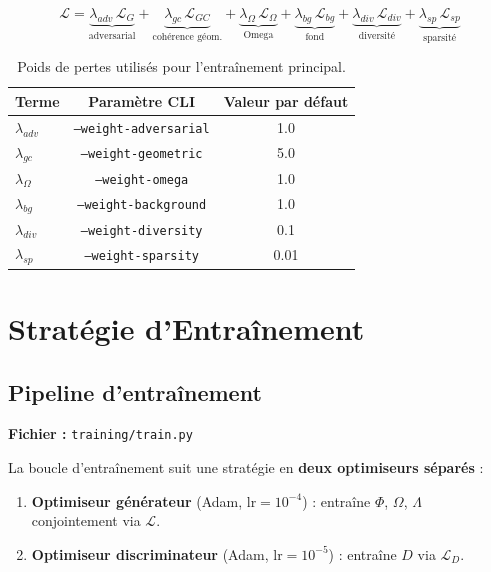 \documentclass[12pt,a4paper]{article}
\begin{document}
\begin{equation}
  \mathcal{L} = \underbrace{\lambda_{adv}\,\mathcal{L}_G}_{\text{adversarial}}
              + \underbrace{\lambda_{gc}\,\mathcal{L}_{GC}}_{\text{cohérence géom.}}
              + \underbrace{\lambda_\Omega\,\mathcal{L}_\Omega}_{\text{Omega}}
              + \underbrace{\lambda_{bg}\,\mathcal{L}_{bg}}_{\text{fond}}
              + \underbrace{\lambda_{div}\,\mathcal{L}_{div}}_{\text{diversité}}
              + \underbrace{\lambda_{sp}\,\mathcal{L}_{sp}}_{\text{sparsité}}
\end{equation}

\begin{table}[H]
  \centering
  \caption{Poids de pertes utilisés pour l'entraînement principal.}
  \begin{tabular}{lcc}
  \toprule
  \textbf{Terme} & \textbf{Paramètre CLI} & \textbf{Valeur par défaut} \\
  \midrule
  $\lambda_{adv}$  & \texttt{--weight-adversarial} & 1.0 \\
  $\lambda_{gc}$   & \texttt{--weight-geometric}   & 5.0 \\
  $\lambda_\Omega$ & \texttt{--weight-omega}        & 1.0 \\
  $\lambda_{bg}$   & \texttt{--weight-background}   & 1.0 \\
  $\lambda_{div}$  & \texttt{--weight-diversity}    & 0.1 \\
  $\lambda_{sp}$   & \texttt{--weight-sparsity}     & 0.01 \\
  \bottomrule
  \end{tabular}
\end{table}

\section{Stratégie d'Entraînement}

\subsection{Pipeline d'entraînement}

\textbf{Fichier :} \texttt{training/train.py}

La boucle d'entraînement suit une stratégie en \textbf{deux optimiseurs séparés} :

\begin{enumerate}
  \item \textbf{Optimiseur générateur} (Adam, $\text{lr}=10^{-4}$) :
        entraîne $\Phi$, $\Omega$, $\Lambda$ conjointement via $\mathcal{L}$.
  \item \textbf{Optimiseur discriminateur} (Adam, $\text{lr}=10^{-5}$) :
        entraîne $D$ via $\mathcal{L}_D$.
\end{enumerate}
\end{document}
